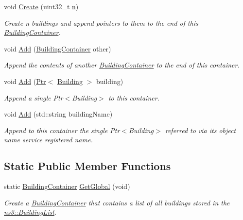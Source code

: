 \begin{DoxyCompactItemize}
void \hyperlink{classns3_1_1BuildingContainer_a1eb99849d2f717196f19bfb2deb6f00e}{Create} (uint32\+\_\+t \hyperlink{lte__link__budget__x2__handover__measures_8m_abdb05bc5a064cf642a06c83b3392f148}{n})
\begin{DoxyCompactList}\small\item\em Create n buildings and append pointers to them to the end of this \hyperlink{classns3_1_1BuildingContainer}{Building\+Container}. \end{DoxyCompactList}\item 
void \hyperlink{classns3_1_1BuildingContainer_a6838e98eea950417eba79d1a12203503}{Add} (\hyperlink{classns3_1_1BuildingContainer}{Building\+Container} other)
\begin{DoxyCompactList}\small\item\em Append the contents of another \hyperlink{classns3_1_1BuildingContainer}{Building\+Container} to the end of this container. \end{DoxyCompactList}\item 
void \hyperlink{classns3_1_1BuildingContainer_ad6599b6e844abe71dec13b3b3d6feca1}{Add} (\hyperlink{classns3_1_1Ptr}{Ptr}$<$ \hyperlink{classns3_1_1Building}{Building} $>$ building)
\begin{DoxyCompactList}\small\item\em Append a single Ptr$<$\+Building$>$ to this container. \end{DoxyCompactList}\item 
void \hyperlink{classns3_1_1BuildingContainer_a8ec49de612939ec898fc3e63b6f1f75f}{Add} (std\+::string building\+Name)
\begin{DoxyCompactList}\small\item\em Append to this container the single Ptr$<$\+Building$>$ referred to via its object name service registered name. \end{DoxyCompactList}\end{DoxyCompactItemize}
\subsection*{Static Public Member Functions}
\begin{DoxyCompactItemize}
\item 
static \hyperlink{classns3_1_1BuildingContainer}{Building\+Container} \hyperlink{classns3_1_1BuildingContainer_aeb981db901ebe02e4924de538191f09c}{Get\+Global} (void)
\begin{DoxyCompactList}\small\item\em Create a \hyperlink{classns3_1_1BuildingContainer}{Building\+Container} that contains a list of {\itshape all} buildings stored in the \hyperlink{classns3_1_1BuildingList}{ns3\+::\+Building\+List}. \end{DoxyCompactList}\end{DoxyCompactItemize}
